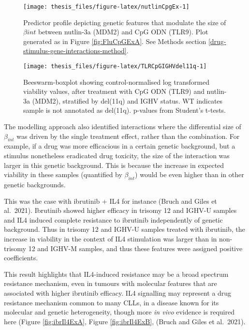 \documentclass[11pt, a4paper, twosided]{book}
\begin{document}
\begin{figure}

{\centering \texttt{[image: thesis\_files/figure-latex/nutlinCpgEx-1]} 

}

\caption{Predictor profile depicting genetic features that modulate the size of \(\beta{int}\) between nutlin-3a (MDM2) and CpG ODN (TLR9). Plot generated as in Figure \ref{fig:FluCpGExA}. See Methods section \ref{drug-stimulus-gene-interactions-method}.}\label{fig:nutlinCpgEx}
\end{figure}

\begin{figure}

{\centering \texttt{[image: thesis\_files/figure-latex/TLRCpGIGHVdel11q-1]} 

}

\caption{Beeswarm-boxplot showing control-normalised log transformed viability values, after treatment with CpG ODN (TLR9) and nutlin-3a (MDM2), stratified by del(11q) and IGHV status. WT indicates sample is not annotated as del(11q). p-values from Student's t-tests.}\label{fig:TLRCpGIGHVdel11q}
\end{figure}
The modelling approach also identified interactions where the differential size of \(\beta_{int}\) was driven by the single treatment effect, rather than the combination. For example, if a drug was more efficacious in a certain genetic background, but a stimulus nonetheless eradicated drug toxicity, the size of the interaction was larger in this genetic background. This is because the increase in expected viability in these samples (quantified by \(\beta_{int}\)) would be even higher than in other genetic backgrounds.

This was the case with ibrutinib + IL4 for instance (Bruch and Giles et al.~2021). Ibrutinib showed higher efficacy in trisomy 12 and IGHV-U samples and IL4 induced complete resistance to ibrutinib independently of genetic background. Thus in trisomy 12 and IGHV-U samples treated with ibrutinib, the increase in viability in the context of IL4 stimulation was larger than in non-trisomy 12 and IGHV-M samples, and thus these features were assigned positive coefficients.

This result highlights that IL4-induced resistance may be a broad spectrum resistance mechanism, even in tumours with molecular features that are associated with higher ibrutinib efficacy. IL4 signalling may represent a drug resistance mechanism common to many CLLs, in a disease known for its molecular and genetic heterogeneity, though more \emph{in vivo} evidence is required here (Figure \ref{fig:ibrIl4ExA}, Figure \ref{fig:ibrIl4ExB}, (Bruch and Giles et al.~2021).
\end{document}

